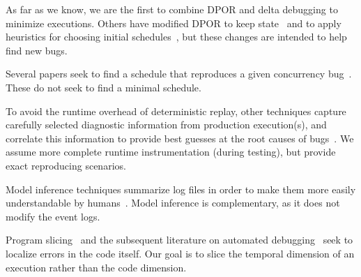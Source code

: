 As far as we know, we are the first to combine DPOR and delta debugging to
minimize executions. Others have modified DPOR to keep state~\cite{yang2008efficient,yi2006stateful}
and to apply heuristics for choosing initial schedules~\cite{lauterburg2010evaluating}, but these
changes are intended to help find new bugs.


 Several papers seek to find a schedule that
reproduces a given concurrency bug~\cite{zamfir2011debug,Zamfir:2010:EST:1755913.1755946,altekar2009odr,park2009pres}.
These do not seek to find a minimal schedule.

 To avoid the runtime overhead of deterministic replay, other techniques
capture carefully selected diagnostic information from production execution(s), and correlate this information
to provide best guesses at the root causes of
bugs~\cite{barham2004using,Chen02pinpoint:problem,Yuan:2010:SED:1736020.1736038,kasikci2015failure,sangmin}.
We assume more complete runtime instrumentation (during testing), but provide exact reproducing
scenarios.

 Model inference techniques summarize log files
in order to make them more easily understandable by
humans~\cite{ernst2001dynamically,synoptic,csight,biermann1972synthesis,lorenzoli2008automatic,lou2010mining}.
Model inference is complementary, as it does not modify the event logs. %

 Program slicing~\cite{weiser1981program}
and the subsequent literature on automated
debugging~\cite{zhangzhang,jose11,coverage_localization,xuan14,zeller2005,comparative_causality}
seek to localize errors in the code itself.
Our goal is to slice the temporal dimension of an execution rather than the
code dimension.

